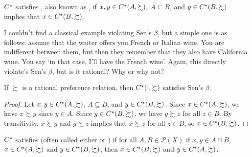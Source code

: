 \documentclass[12pt]{article}
\begin{document}
\begin{definition}
	$C^\star$ satisfies , also known as , if $x,y \in C^\star(A,\succsim)$, $A \subseteq B$, and $y \in C^\star(B,\succsim)$ implies that $x \in C^\star(B,\succsim)$.
\end{definition}

\begin{remark}
	I couldn't find a classical example violating Sen's $\beta$, but a simple one is as follows: assume that the waiter offers you French or Italian wine. You are indifferent between them, but then they remember that they also have California wine. You say 	`in that case, I'll have the French wine'. Again, this directly violate's Sen's $\beta$, but is it rational? Why or why not?
\end{remark}

\begin{proposition}\label{prop:rational_beta}
	If $\succsim$ is a rational preference relation, then $C^\star(\cdot,\succsim)$ satisfies Sen's $\beta$.
\end{proposition}
\begin{proof}
	Let $x,y \in C^\star(A,\succsim)$, $A \subseteq B$, and $y \in C^\star(B,\succsim)$. Since $x \in C^\star(A,\succsim)$, we have $x \succsim y$ since $y \in A$. Since $y \in C^\star(B,\succsim)$, we have $y\succsim z$ for all $z \in B$. By transitivity, $x \succsim y$ and $y \succsim z$ implies that $x \succsim z$ for all $z \in B$, so $x\in C^\star(B,\succsim)$. 
\end{proof}

\begin{definition}
	$C^\star$ satisfies  (often called either  or ) if for all $A,B \in \mathcal{P}(X)$ if $x,y \in A \cap B$, $x \in C^\star(A,\succsim)$ and $y \in C^\star(B,\succsim)$, then $x \in C^\star(B,\succsim)$ and $y \in C^\star(A,\succsim)$.
\end{definition}
\end{document}
